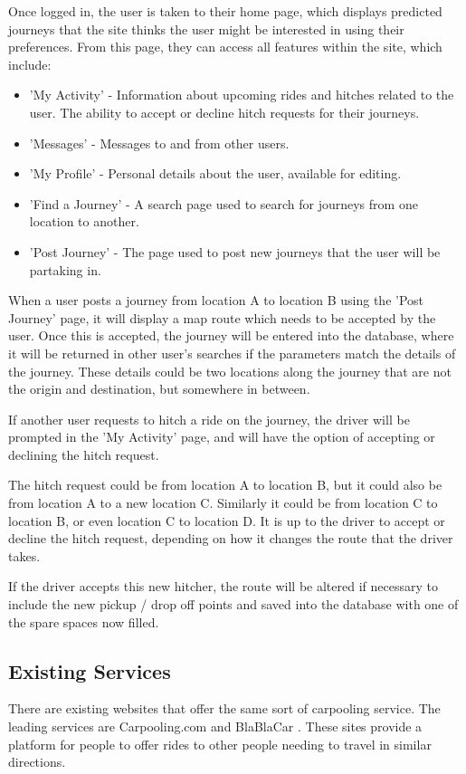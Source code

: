 	Once logged in, the user is taken to their home page, which displays predicted journeys that the site thinks the user might be interested in using their preferences. From this page, they can access all features within the site, which include:
	\begin{itemize}
		\item 'My Activity' - Information about upcoming rides and hitches related to the user. The ability to accept or decline hitch requests for their journeys.
		\item 'Messages' - Messages to and from other users.
		\item 'My Profile' - Personal details about the user, available for editing.
		\item 'Find a Journey' - A search page used to search for journeys from one location to another.
		\item 'Post Journey' - The page used to post new journeys that the user will be partaking in.		
	\end{itemize}
	
	When a user posts a journey from location A to location B using the 'Post Journey' page, it will display a map route which needs to be accepted by the user. Once this is accepted, the journey will be entered into the database, where it will be returned in other user's searches if the parameters match the details of the journey. These details could be two locations along the journey that are not the origin and destination, but somewhere in between.
	
	If another user requests to hitch a ride on the journey, the driver will be prompted in the 'My Activity' page, and will have the option of accepting or declining the hitch request. 
	
	The hitch request could be from location A to location B, but it could also be from location A to a new location C. Similarly it could be from location C to location B, or even location C to location D. It is up to the driver to accept or decline the hitch request, depending on how it changes the route that the driver takes.
	
	If the driver accepts this new hitcher, the route will be altered if necessary to include the new pickup / drop off points and saved into the database with one of the spare spaces now filled.
	 
\subsection{Existing Services}
	There are existing websites that offer the same sort of carpooling service. The leading services are Carpooling.com \cite{carpooling_com} and BlaBlaCar \cite{blabla}. These sites provide a platform for people to offer rides to other people needing to travel in similar directions.
	
